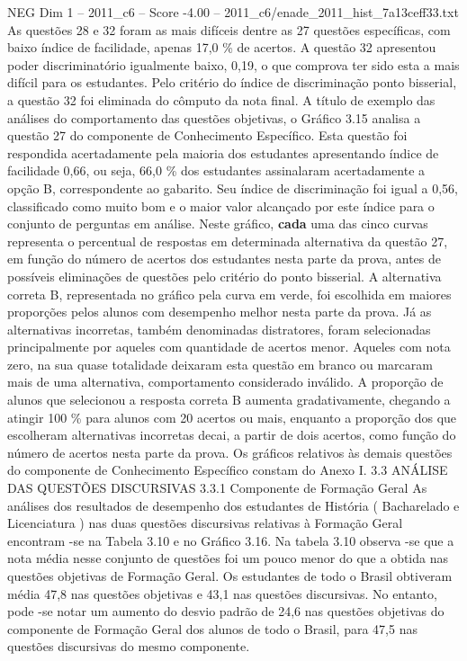 \begin{textsample}{NEG Dim 1 – 2011\_c6 – Score -4.00 – 2011\_c6/enade\_2011\_hist\_7a13ceff33.txt}
As questões 28 e 32 foram as mais difíceis dentre as 27 questões específicas, com baixo índice de facilidade, apenas 17,0 \% de acertos.
A questão 32 apresentou poder discriminatório igualmente baixo, 0,19, o que comprova ter sido esta a mais difícil para os estudantes.
Pelo critério do índice de discriminação ponto bisserial, a questão 32 foi eliminada do cômputo da nota final.
A título de exemplo das análises do comportamento das questões objetivas, o Gráfico 3.15 analisa a questão 27 do componente de Conhecimento Específico.
Esta questão foi respondida acertadamente pela maioria dos estudantes apresentando índice de facilidade 0,66, ou seja, 66,0 \% dos estudantes assinalaram acertadamente a opção B, correspondente ao gabarito.
Seu índice de discriminação foi igual a 0,56, classificado como muito bom e o maior valor alcançado por este índice para o conjunto de perguntas em análise.
Neste gráfico, \textbf{cada} uma das cinco curvas representa o percentual de respostas em determinada alternativa da questão 27, em função do número de acertos dos estudantes nesta parte da prova, antes de possíveis eliminações de questões pelo critério do ponto bisserial.
A alternativa correta B, representada no gráfico pela curva em verde, foi escolhida em maiores proporções pelos alunos com desempenho melhor nesta parte da prova.
Já as alternativas incorretas, também denominadas distratores, foram selecionadas principalmente por aqueles com quantidade de acertos menor.
Aqueles com nota zero, na sua quase totalidade deixaram esta questão em branco ou marcaram mais de uma alternativa, comportamento considerado inválido.
A proporção de alunos que selecionou a resposta correta B aumenta gradativamente, chegando a atingir 100 \% para alunos com 20 acertos ou mais, enquanto a proporção dos que escolheram alternativas incorretas decai, a partir de dois acertos, como função do número de acertos nesta parte da prova.
Os gráficos relativos às demais questões do componente de Conhecimento Específico constam do Anexo I. 3.3 ANÁLISE DAS QUESTÕES DISCURSIVAS 3.3.1 Componente de Formação Geral As análises dos resultados de desempenho dos estudantes de História ( Bacharelado e Licenciatura ) nas duas questões discursivas relativas à Formação Geral encontram -se na Tabela 3.10 e no Gráfico 3.16.
Na tabela 3.10 observa -se que a nota média nesse conjunto de questões foi um pouco menor do que a obtida nas questões objetivas de Formação Geral.
Os estudantes de todo o Brasil obtiveram média 47,8 nas questões objetivas e 43,1 nas questões discursivas.
No entanto, pode -se notar um aumento do desvio padrão de 24,6 nas questões objetivas do componente de Formação Geral dos alunos de todo o Brasil, para 47,5 nas questões discursivas do mesmo componente.

\end{textsample}
